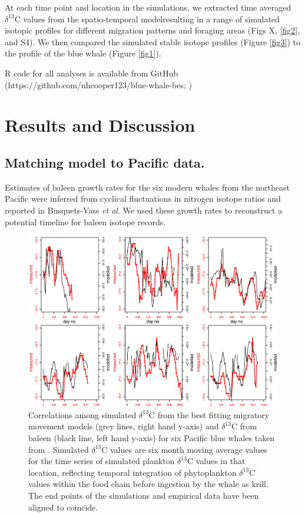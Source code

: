 \documentclass[a4paper,12pt]{article}
\begin{document}
At each time point and location in the simulations, we extracted time averaged \(\delta^{13}\)C values from the spatio-temporal model\cite{magozzi2017using}resulting in a range of simulated isotopic profiles for different migration patterns and foraging areas (Figs X, \ref{fig2}, and S4).
We then compared the simulated stable isotope profiles (Figure \ref{fig3}) to the profile of the blue whale (Figure \ref{fig1}).

R code for all analyses is available from GitHub (https://github.com/nhcooper123/blue-whale-bes; \cite{github})

\section{Results and Discussion}

\subsection{Matching model to Pacific data.}

Estimates of baleen growth rates for the six modern whales from the northeast Pacific were inferred from cyclical fluctuations in nitrogen isotope ratios and reported in Busquets-Vass \textit{et al}\cite{busquets2017estimating}. 
We used these growth rates to reconstruct a potential timeline for baleen isotope records.

\begin{figure}
 \centering
  \includegraphics[width = \linewidth]{figures/figure-Pacific-draft.eps}
  \caption{Correlations among simulated $\delta^{13}$C from the best fitting migratory movement models (grey lines, right hand y-axis) and $\delta^{13}$C from baleen (black line, left hand y-axis) for six Pacific blue whales taken from \cite{busquets2017estimating}. 
  Simulated $\delta^{13}$C values are six month moving average values for the time series of simulated plankton $\delta^{13}$C values in that location, reflecting temporal integration of phytoplankton $\delta^{13}$C values within the food chain before ingestion by the whale as krill. 
  The end points of the simulations and empirical data have been aligned to coincide.
}
  \label{pacific}
\end{figure}
\end{document}

